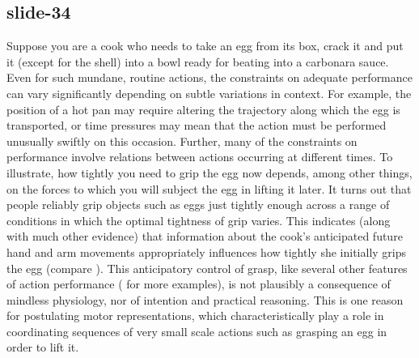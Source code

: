 \documentclass[12pt,\papersize]{extarticle}
\begin{document}
\subsection{slide-34}
Suppose you are a cook who needs to take an egg from its box, crack it and put it (except for the
shell) into a bowl ready for beating into a carbonara sauce.
Even for such mundane, routine actions, the constraints on adequate performance can vary
significantly depending on subtle variations in context. For example, the position of a hot pan
may require altering the trajectory along which the egg is transported, or time pressures may mean
that the action must be performed unusually swiftly on this occasion.
Further, many of the constraints on performance involve relations between actions occurring at
different times.
To illustrate, how tightly you need to grip the egg now depends, among other things, on the forces
to which you will subject the egg in lifting it later.
It turns out that people reliably grip objects such as eggs just tightly enough across a range of
conditions in which the optimal tightness of grip varies.
This indicates (along with much other evidence) that information about the cook’s anticipated
future hand and arm movements appropriately influences how tightly she initially grips the egg
(compare \citealp{kawato:1999_internal}).
This anticipatory control of grasp,
like several other features of action performance (\citealp[see][chapter 1]{rosenbaum:2010_human} for more examples),
is not plausibly a consequence of mindless physiology, nor of intention and practical reasoning.
This is one reason for postulating motor representations, which characteristically play a role in
coordinating sequences of very small scale actions such as grasping an egg in order to lift it.
\end{document}
